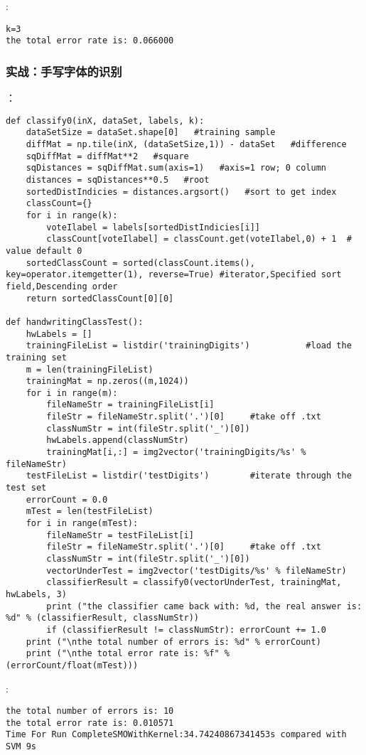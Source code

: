 :
\begin{lstlisting}
k=3
the total error rate is: 0.066000
\end{lstlisting}

\subsubsection{实战：手写字体的识别}
：
\begin{lstlisting}
def classify0(inX, dataSet, labels, k):
    dataSetSize = dataSet.shape[0]   #training sample
    diffMat = np.tile(inX, (dataSetSize,1)) - dataSet   #difference
    sqDiffMat = diffMat**2   #square
    sqDistances = sqDiffMat.sum(axis=1)   #axis=1 row; 0 column
    distances = sqDistances**0.5   #root
    sortedDistIndicies = distances.argsort()   #sort to get index
    classCount={}
    for i in range(k):
        voteIlabel = labels[sortedDistIndicies[i]]
        classCount[voteIlabel] = classCount.get(voteIlabel,0) + 1  # value default 0
    sortedClassCount = sorted(classCount.items(), key=operator.itemgetter(1), reverse=True) #iterator,Specified sort field,Descending order
    return sortedClassCount[0][0]
    
def handwritingClassTest():
    hwLabels = []
    trainingFileList = listdir('trainingDigits')           #load the training set
    m = len(trainingFileList)
    trainingMat = np.zeros((m,1024))
    for i in range(m):
        fileNameStr = trainingFileList[i]
        fileStr = fileNameStr.split('.')[0]     #take off .txt
        classNumStr = int(fileStr.split('_')[0])
        hwLabels.append(classNumStr)
        trainingMat[i,:] = img2vector('trainingDigits/%s' % fileNameStr)
    testFileList = listdir('testDigits')        #iterate through the test set
    errorCount = 0.0
    mTest = len(testFileList)
    for i in range(mTest):
        fileNameStr = testFileList[i]
        fileStr = fileNameStr.split('.')[0]     #take off .txt
        classNumStr = int(fileStr.split('_')[0])
        vectorUnderTest = img2vector('testDigits/%s' % fileNameStr)
        classifierResult = classify0(vectorUnderTest, trainingMat, hwLabels, 3)
        print ("the classifier came back with: %d, the real answer is: %d" % (classifierResult, classNumStr))
        if (classifierResult != classNumStr): errorCount += 1.0
    print ("\nthe total number of errors is: %d" % errorCount)
    print ("\nthe total error rate is: %f" % (errorCount/float(mTest)))
\end{lstlisting}
:
\begin{lstlisting}
the total number of errors is: 10
the total error rate is: 0.010571
Time For Run CompleteSMOWithKernel:34.74240867341453s compared with SVM 9s
\end{lstlisting}


